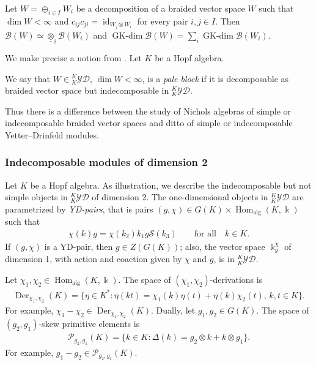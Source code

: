 \documentclass[10pt,a4paper]{amsart}
\numberwithin{equation}{section}
\newcommand{\Der}{\operatorname{Der}}
\newcommand{\GK}{\operatorname{GK-dim}}
\newcommand{\Hom}{\operatorname{Hom}}
\newcommand{\id}{\operatorname{id}}
\newcommand{\toba}{\mathscr B}
\newcommand{\Pc}{{\mathcal{P}}}
\newcommand{\Ss}{\mathcal{S}}
\newcommand{\yd}[1]{{}_{#1}^{#1}\mathcal{YD}}
\begin{document}
\begin{Remark}\label{obs:connected} Let $W = \oplus_{i \in I} W_i$ be a decomposition of a
braided vector space $W$ such that $\dim W < \infty$ and
$c_{ij}c_{ji} = \id_{W_j \otimes W_i}$ for every pair $i,j \in I$. Then
$\toba(W) \simeq \underline{\otimes}_i\toba(W_i)$ \cite{gr-jalg} and $\GK\toba(W) = \sum_i \GK \toba(W_i)$.
\end{Remark}



We make precise a notion from \cite{AAH-triang}. Let $K$ be a Hopf algebra.

\begin{Definition}%
We say that
$W \in \yd{K}$, $\dim W < \infty$, is a \emph{pale block} if it is decomposable as braided vector space but indecomposable in $\yd{K}$.
\end{Definition}

Thus there is a difference between the study of Nichols algebras of simple or indecomposable
braided vector spaces and ditto of simple or indecomposable Yetter--Drinfeld modules.


\subsubsection{Indecomposable modules of dimension 2}%
Let $K$ be a Hopf algebra.
As illustration, we describe the indecomposable but not simple objects in $\yd{K}$ of dimension 2.
The one-dimensional objects in $\yd{K}$ are parametrized by
\emph{YD-pairs}, that is pairs
$(g, \chi) \in G(K) \times \Hom_{\text{alg}}(K, \Bbbk)$ such that
\begin{align}\label{eq:yd-pair}
\chi(k) g = \chi(k_{2}) k_{1} g \Ss(k_{3})\qquad \text{for all}\quad k\in K.
\end{align}
If $(g, \chi)$ is a YD-pair, then $g\in Z(G(K))$; also, the vector space $\Bbbk_g^{\chi}$ of dimension 1,
with action and coaction given by $\chi $ and $g$, is in $\yd{K}$.

Let $\chi_1, \chi_2 \in \Hom_{\text{alg}}(K, \Bbbk)$. The space of $(\chi_1,\chi_2)$-derivations is
\begin{align*}
\Der_{\chi_1,\chi_2}(K) = \{\eta\in K^*\colon \eta(kt) = \chi_1(k)\eta(t) + \eta(k)\chi_2(t), \, k,t \in K\}.
\end{align*}
For example, $\chi_1 - \chi_2 \in \Der_{\chi_1,\chi_2}(K)$.
Dually, let $g_1, g_2 \in G(K)$. The space of $(g_2,g_1)$-skew primitive elements is
\begin{align*}
\Pc_{g_2,g_1}(K) = \{k\in K\colon \Delta(k) = g_2\otimes k + k \otimes g_1\}.
\end{align*}
For example, $g_1 - g_2 \in \Pc_{g_2,g_1}(K)$.
\end{document}
